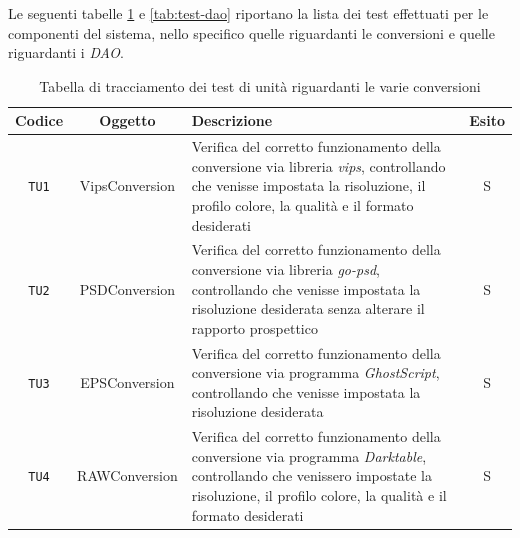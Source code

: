 Le seguenti tabelle \ref{tab:test-conversioni} e \ref{tab:test-dao} riportano la
lista dei test effettuati per le componenti del sistema, nello specifico quelle
riguardanti le conversioni e quelle riguardanti i \emph{DAO}.
\begin{table}[H]
    \caption{Tabella di tracciamento dei test di unità riguardanti le varie conversioni}
    \label{tab:test-conversioni}
    \centering
    \begin{tabularx}{\textwidth}{|c|c|X|c|}
        \hline
        \textbf{Codice}                  & \textbf{Oggetto} & \textbf{Descrizione}                                                                                                                                                                             & \textbf{Esito} \\
        \hline
        \verb|TU1|                       & VipsConversion   & Verifica del corretto funzionamento della conversione via libreria \emph{vips}, controllando che venisse impostata la risoluzione, il profilo colore, la qualità e il formato desiderati         & S              \\
        \hline
        \verb|TU2|                       & PSDConversion    & Verifica del corretto funzionamento
        della conversione via libreria \emph{go-psd}, controllando che venisse
        impostata la risoluzione desiderata senza
        alterare il rapporto prospettico & S                                                                                                                                                                                                                                    \\
        \hline
        \verb|TU3|                       & EPSConversion    & Verifica del corretto funzionamento della conversione via programma \emph{GhostScript}, controllando che venisse impostata la risoluzione desiderata                                             & S              \\
        \hline
        \verb|TU4|                       & RAWConversion    & Verifica del corretto funzionamento della conversione via programma \emph{Darktable}, controllando che venissero impostate la risoluzione, il profilo colore, la qualità e il formato desiderati & S              \\
        \hline
    \end{tabularx}
\end{table}
\newpage
